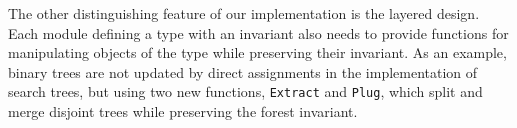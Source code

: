 \documentclass{llncs}
\begin{document}
The other distinguishing feature of our implementation is the layered design. Each module
defining a type with an invariant also needs to provide functions for
manipulating objects of the type while preserving their invariant. As an example,
binary trees are not updated by direct assignments in the implementation of search
trees, but using two new functions, \texttt{Extract} and
\texttt{Plug}, which split and merge disjoint trees while preserving the forest invariant.

%


\end{document}
